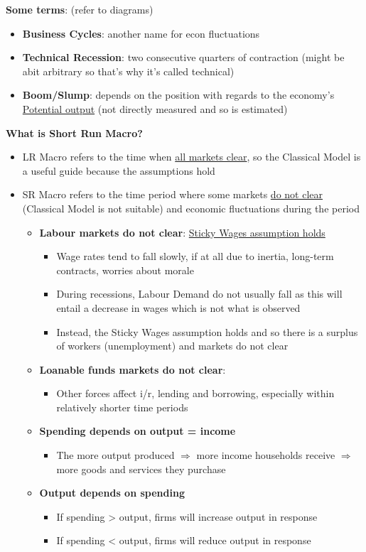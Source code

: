 \documentclass{article}
\begin{document}
\begin{multicols}{2}
\begin{figure}[H]
\end{figure}
\textbf{Some terms}: (refer to diagrams)
\begin{itemize}
	\item \textbf{Business Cycles}: another name for econ fluctuations
	\item \textbf{Technical Recession}: two consecutive quarters of contraction (might be abit arbitrary so that's why it's called technical)
	\item \textbf{Boom/Slump}: depends on the position with regards to the economy's \underline{Potential output} (not directly measured and so is estimated)
\end{itemize}
\textbf{What is Short Run Macro?}
\begin{itemize}
	\item LR Macro refers to the time when \underline{all markets clear}, so the Classical Model is a useful guide because the assumptions hold
	\item SR Macro refers to the time period where some markets \underline{do not clear} (Classical Model is not suitable) and economic fluctuations during the period
	\begin{itemize}
		\item \textbf{Labour markets do not clear}: \underline{Sticky Wages assumption holds}
		\begin{itemize}
			\item Wage rates tend to fall slowly, if at all due to inertia, long-term contracts, worries about morale
			\item During recessions, Labour Demand do not usually fall as this will entail a decrease in wages which is not what is observed
			\item Instead, the Sticky Wages assumption holds and so there is a surplus of workers (unemployment) and markets do not clear
		\end{itemize}
		\item \textbf{Loanable funds markets do not clear}:
		\begin{itemize}
			\item Other forces affect i/r, lending and borrowing, especially within relatively shorter time periods
		\end{itemize}
		\item \textbf{Spending depends on output = income}
		\begin{itemize}
			\item The more output produced $\Rightarrow$ more income households receive $\Rightarrow$ more goods and services they purchase
		\end{itemize}
	    \item \textbf{Output depends on spending}
	    \begin{itemize}
	    	\item If spending > output, firms will increase output in response
	    	\item If spending < output, firms will reduce output in response
	    \end{itemize}
	\end{itemize}
\end{itemize}

\end{multicols}
\end{document}
